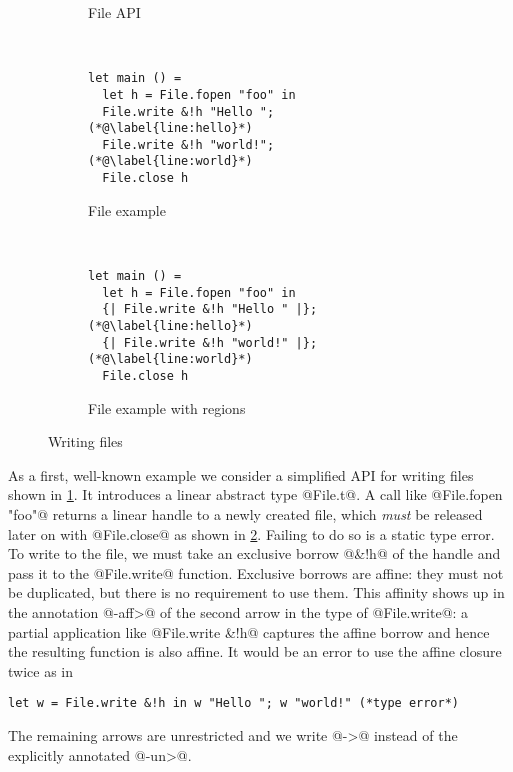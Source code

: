 \begin{figure}[tp]
  \begin{subfigure}[t]{0.35\linewidth}
    
    \vspace{-15pt}
    \caption{File API}
    \label{fig:writing-files-api}
  \end{subfigure}~
  \begin{subfigure}[t]{0.3\linewidth}
\begin{lstlisting}
let main () =
  let h = File.fopen "foo" in
  File.write &!h "Hello ";(*@\label{line:hello}*)
  File.write &!h "world!";(*@\label{line:world}*)
  File.close h
\end{lstlisting}
    \vspace{-10pt}
    \caption{File example}
    \label{fig:writing-files-example}
  \end{subfigure}~
  \begin{subfigure}[t]{0.3\linewidth}
\begin{lstlisting}
let main () =
  let h = File.fopen "foo" in
  {| File.write &!h "Hello " |};(*@\label{line:hello}*)
  {| File.write &!h "world!" |};(*@\label{line:world}*)
  File.close h
\end{lstlisting}
    \vspace{-10pt}
    \caption{File example with regions}
    \label{fig:writing-files-example-region}
  \end{subfigure}
  \vspace{-10pt}
  \caption{Writing files}
  \label{fig:writing-files}
\end{figure}



As a first, well-known example we consider a simplified API for
writing files shown in \cref{fig:writing-files-api}.  It introduces a
linear abstract type @File.t@. A call like
@File.fopen "foo"@ returns a linear handle to a newly created
file, which \emph{must} be released later on with @File.close@
as shown in \cref{fig:writing-files-example}. Failing to do so is a
static type error.  To write to the file, we must take an exclusive
borrow @&!h@ of the handle and pass it to the
@File.write@ function. Exclusive borrows are affine:
they must not be duplicated, but there is no requirement to use
them. This affinity shows up in the annotation @-{aff}>@ of the second arrow in
the type of @File.write@: a partial application like
@File.write &!h@ captures the affine borrow and hence the
resulting function is also affine. It
would be an error to use the affine closure twice as in
\begin{lstlisting}[numbers=none]
let w = File.write &!h in w "Hello "; w "world!" (*type error*)
\end{lstlisting}
The remaining arrows are unrestricted and we write @->@ instead of the
explicitly annotated @-{un}>@.

